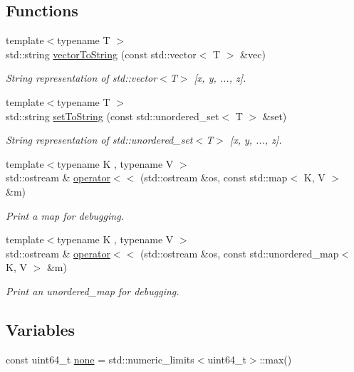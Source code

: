 \subsection*{Functions}
\begin{DoxyCompactItemize}
\item 
{\footnotesize template$<$typename T $>$ }\\std\-::string \hyperlink{namespace_aux_ab4521a43e56fafd63f5621cc646c2ed5}{vector\-To\-String} (const std\-::vector$<$ T $>$ \&vec)
\begin{DoxyCompactList}\small\item\em String representation of std\-::vector$<$\-T$>$ \mbox{[}x, y, ..., z\mbox{]}. \end{DoxyCompactList}\item 
{\footnotesize template$<$typename T $>$ }\\std\-::string \hyperlink{namespace_aux_a6e4cc22cf4fdf5f9a6adae091c146d75}{set\-To\-String} (const std\-::unordered\-\_\-set$<$ T $>$ \&set)
\begin{DoxyCompactList}\small\item\em String representation of std\-::unordered\-\_\-set$<$\-T$>$ \mbox{[}x, y, ..., z\mbox{]}. \end{DoxyCompactList}\item 
{\footnotesize template$<$typename K , typename V $>$ }\\std\-::ostream \& \hyperlink{namespace_aux_aca2933c9253bfd8057d3f85b45dc0134}{operator$<$$<$} (std\-::ostream \&os, const std\-::map$<$ K, V $>$ \&m)
\begin{DoxyCompactList}\small\item\em Print a map for debugging. \end{DoxyCompactList}\item 
{\footnotesize template$<$typename K , typename V $>$ }\\std\-::ostream \& \hyperlink{namespace_aux_a4822f1875a9abce8115391bb003ba08b}{operator$<$$<$} (std\-::ostream \&os, const std\-::unordered\-\_\-map$<$ K, V $>$ \&m)
\begin{DoxyCompactList}\small\item\em Print an unordered\-\_\-map for debugging. \end{DoxyCompactList}\end{DoxyCompactItemize}
\subsection*{Variables}
\begin{DoxyCompactItemize}
\item 
const uint64\-\_\-t \hyperlink{namespace_aux_a73b3b3418b0aef239654d00cb67d4266}{none} = std\-::numeric\-\_\-limits$<$uint64\-\_\-t$>$\-::max()
\end{DoxyCompactItemize}



